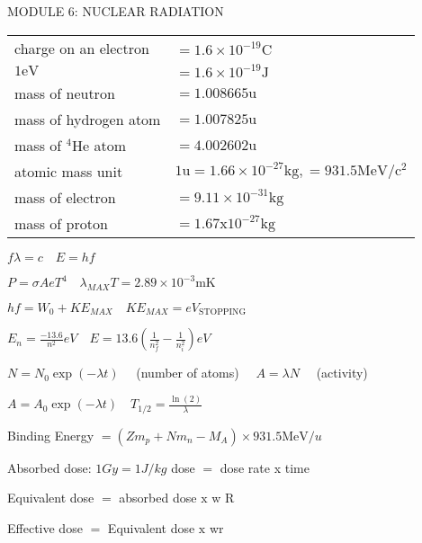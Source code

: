 \documentclass{extarticle}
\begin{document}
\begin{tcolorbox}[enhanced jigsaw,sharp corners,coltext=black,colback=BurntOrange!25!white,boxrule=pt,breakable,size=minimal]

MODULE 6: NUCLEAR RADIATION 

\begin{tabular}{ll} 

charge on an electron & $=1.6 \times 10^{-19} \mathrm{C}$ \\

$1 \mathrm{eV}$ & $=1.6 \times 10^{-19} \mathrm{J}$ \\

mass of neutron & $=1.008665 \mathrm{u}$ \\

mass of hydrogen atom & $=1.007825 \mathrm{u}$ \\

mass of ${ }^{4} \mathrm{He}$ atom & $=4.002602 \mathrm{u}$ \\

atomic mass unit & $1 \mathrm{u}=1.66 \times 10^{-27} \mathrm{kg},=931.5 \mathrm{MeV} / \mathrm{c}^{2}$ \\

mass of electron & $=9.11 \times 10^{-31} \mathrm{kg}$ \\

mass of proton & $=1.67 \mathrm{x} 10^{-27} \mathrm{kg}$ \\

\hline

\end{tabular}







$f \lambda=c \quad E=h f$

$P=\sigma A e T^{4} \quad \lambda_{M A X} T=2.89 \times 10^{-3} \mathrm{mK}$

$h f=W_{0}+K E_{M A X} \quad K E_{M A X}=e V_{\text {STOPPING}}$

$E_{n}=\frac{-13.6}{n^{2}} e V \quad E=13.6\left(\frac{1}{n_{f}^{2}}-\frac{1}{n_{i}^{2}}\right) e V$

$N=N_{0} \exp (-\lambda t) \quad$ (number of atoms) $\quad A=\lambda N \quad$ (activity)

$A=A_{0} \exp (-\lambda t) \quad T_{1 / 2}=\frac{\ln (2)}{\lambda}$

Binding Energy $=\left(Z m_{p}+N m_{n}-M_{A}\right) \times 931.5 \mathrm{MeV} / u$

Absorbed dose: $1 G y=1 J / k g$ dose $=$ dose rate x time









Equivalent dose $=$ absorbed dose $\mathrm{x}$ w $\mathrm{R}$

Effective dose $=$ Equivalent dose $\mathrm{x}$ wr











\end{tcolorbox}
\end{document}
